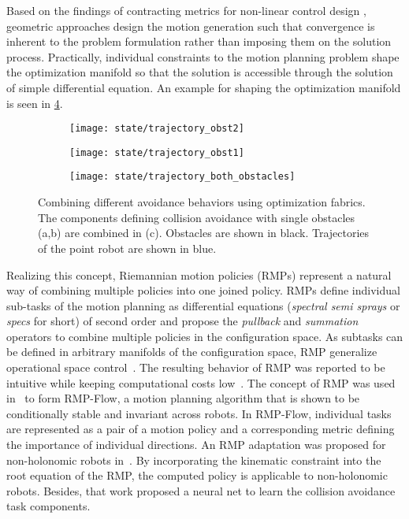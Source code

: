 Based on the findings of contracting metrics for non-linear
control design \cite{l2,l3}, geometric approaches design the motion
generation such that convergence is inherent to the problem formulation
rather than imposing them on the solution process. Practically, individual
constraints to the motion planning problem shape the optimization manifold
so that the solution is accessible through the solution of simple differential
equation. An example for shaping the optimization
manifold is seen in \cref{fig:spec_combination}.

%
\begin{figure}[h]
  \centering
  \begin{subfigure}{0.33\linewidth}
    \centering
    \texttt{[image: state/trajectory\_obst2]}
    \caption{}
    \label{subfig:trajectory_obst1}
  \end{subfigure}%
  \begin{subfigure}{0.33\linewidth}
    \centering
    \texttt{[image: state/trajectory\_obst1]}
    \caption{}
    \label{subfig:trajectory_obst2}
  \end{subfigure}%
  \begin{subfigure}{0.33\linewidth}
    \centering
    \texttt{[image: state/trajectory\_both\_obstacles]}
    \caption{}
    \label{subfig:trajectory_both_obstacles}
  \end{subfigure}
  \caption{
    Combining different avoidance behaviors using optimization fabrics. The
    components defining collision avoidance with single obstacles (a,b) are
    combined in (c). Obstacles are shown in black. Trajectories of the point
    robot are shown in blue.
  }
  \label{fig:spec_combination}
\end{figure}
%
Realizing this concept, Riemannian motion policies (RMPs) represent a
natural way of combining multiple policies into one joined policy.
RMPs define individual sub-tasks of the motion planning as
differential equations (\textit{spectral semi sprays} or
\textit{specs} for short) of second order and propose the
\textit{pullback} and \textit{summation} operators to combine multiple policies
in the configuration space. As subtasks can be defined in arbitrary manifolds
of the configuration space, RMP generalize operational space
control~\cite{Khatib1987}. The resulting behavior of RMP was reported to be
intuitive while keeping computational costs low~\cite{Ratliff2018}. The concept
of RMP was used in~\cite{Cheng2018,Cheng2020} to form RMP-Flow, a motion
planning algorithm that is shown to be conditionally stable and invariant
across robots. In RMP-Flow, individual tasks are represented as a pair of
a motion policy and a corresponding metric defining the importance of
individual directions. An RMP adaptation was proposed for non-holonomic robots
in~\cite{Meng2019}. By incorporating the kinematic constraint into the root
equation of the RMP, the computed policy is applicable to non-holonomic robots.
Besides, that work proposed a neural net to learn the collision avoidance task
components. 

